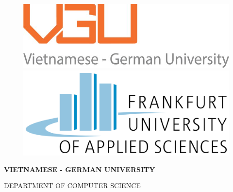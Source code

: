 \documentclass[12pt,twoside]{report}
\begin{document}
\begin{titlepage}
  \begin{center}

  \begin{figure}[htbp]
    \begin{minipage}{0.5\linewidth}
    \centering
    \includegraphics[width=\textwidth]{vgu_logo.jpg}
    \end{minipage}
    \hfill{\hspace{2cm}}
    \begin{minipage}{0.4\textwidth}
    \centering
    \includegraphics[width=\textwidth]{FRA-UAS.png}
    \end{minipage}
    \end{figure}

    \vspace*{1cm}

    \textbf{\large \uppercase{vietnamese - german university}}

    \vspace*{0.5cm}

    \uppercase{\large Department of computer science}

    \vspace*{1cm}


\end{center}
\end{titlepage}
\end{document}
